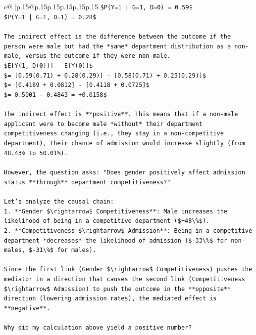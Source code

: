 \documentclass{article}
\begin{document}
{\begin{supertabular}{c@{$\;$}|p{.15\linewidth}@{}p{.15\linewidth}p{.15\linewidth}p{.15\linewidth}p{.15\linewidth}p{.15\linewidth}}
{{{\texttt{\$P(Y=1 | G=1, D=0) = 0.59\$} \\
\texttt{\$P(Y=1 | G=1, D=1) = 0.28\$} \\
\\ 
\texttt{The indirect effect is the difference between the outcome if the person were male but had the *same* department distribution as a non{-}male, versus the outcome if they were non{-}male.} \\
\texttt{\$E{[}Y(1, D(0)){]} {-} E{[}Y(0){]}\$} \\
\texttt{\$= {[}0.59(0.71) + 0.28(0.29){]} {-} {[}0.58(0.71) + 0.25(0.29){]}\$} \\
\texttt{\$= {[}0.4189 + 0.0812{]} {-} {[}0.4118 + 0.0725{]}\$} \\
\texttt{\$= 0.5001 {-} 0.4843 = +0.0158\$} \\
\\ 
\texttt{The indirect effect is **positive**. This means that if a non{-}male applicant were to become male *without* their department competitiveness changing (i.e., they stay in a non{-}competitive department), their chance of admission would increase slightly (from 48.43\% to 50.01\%).} \\
\\ 
\texttt{However, the question asks: "Does gender positively affect admission status **through** department competitiveness?"} \\
\\ 
\texttt{Let's analyze the causal chain:} \\
\texttt{1.  **Gender \$\textbackslash{}rightarrow\$ Competitiveness**: Male increases the likelihood of being in a competitive department (\$+48\textbackslash{}\%\$).} \\
\texttt{2.  **Competitiveness \$\textbackslash{}rightarrow\$ Admission**: Being in a competitive department *decreases* the likelihood of admission (\${-}33\textbackslash{}\%\$ for non{-}males, \${-}31\textbackslash{}\%\$ for males).} \\
\\ 
\texttt{Since the first link (Gender \$\textbackslash{}rightarrow\$ Competitiveness) pushes the mediator in a direction that causes the second link (Competitiveness \$\textbackslash{}rightarrow\$ Admission) to push the outcome in the **opposite** direction (lowering admission rates), the mediated effect is **negative**.} \\
\\ 
\texttt{Why did my calculation above yield a positive number?} \\
}}}
\end{supertabular}}
\end{document}
